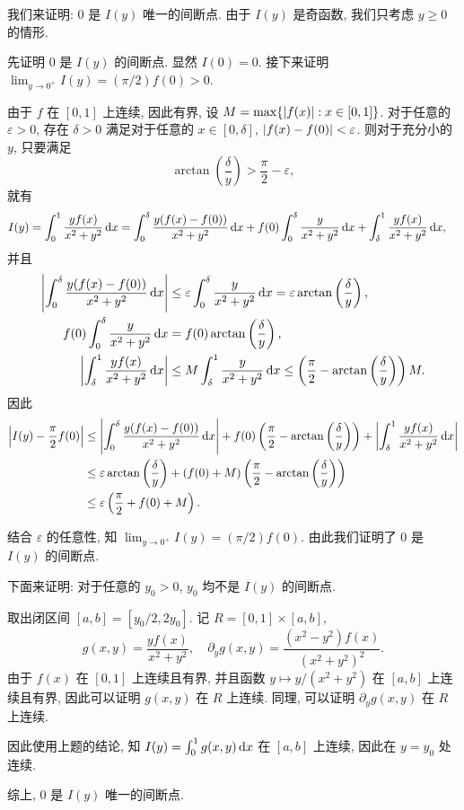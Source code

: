 \documentclass{article}
\begin{document}
\begin{solution}
	我们来证明: $0$ 是 $I(y)$ 唯一的间断点. 由于 $I(y)$ 是奇函数, 我们只考虑 $y\ge 0$ 的情形.

	先证明 $0$ 是 $I(y)$ 的间断点. 显然 $I(0) = 0$. 接下来证明 $\lim_{y\to 0^+} I(y) = (\pi/2)f(0)>0$. 

	由于 $f$ 在 $[0,1]$ 上连续, 因此有界, 设 $M=\max\{\left|f(x)\right|: x\in[0,1]\}$. 对于任意的 $\varepsilon>0$, 存在 $\delta>0$ 满足对于任意的 $x\in [0,\delta]$, $\left|f(x)-f(0)\right| <\varepsilon$. 则对于充分小的 $y$, 只要满足
	\[ \arctan\left( \frac{\delta}{y} \right) > \frac{\pi}{2}-\varepsilon, \]
	就有
	\begin{align*}
		I(y)
		&= \int_{0}^{1}\frac{yf(x)}{x^2+y^2}\,\mathrm{d} x
		= \int_{0}^{\delta}\frac{y(f(x)-f(0))}{x^2+y^2}\,\mathrm{d} x
		+ f(0) \int_{0}^{\delta} \frac{y}{x^2+y^2}\,\mathrm{d} x
		+ \int_{\delta}^{1}\frac{yf(x)}{x^2+y^2}\,\mathrm{d} x,
	\end{align*}
	并且
	\begin{align*}
		\left|\int_{0}^{\delta}\frac{y(f(x)-f(0))}{x^2+y^2}\,\mathrm{d} x\right|
		& \le \varepsilon \int_{0}^{\delta} \frac{y}{x^2+y^2}\,\mathrm{d} x
		=\varepsilon \arctan\left( \frac{\delta}{y} \right),\\
		f(0) \int_{0}^{\delta} \frac{y}{x^2+y^2}\,\mathrm{d} x 
		&= f(0) \arctan \left( \frac{\delta}{y} \right), \\
		\left|\int_{\delta}^{1}\frac{yf(x)}{x^2+y^2}\,\mathrm{d} x\right|
		&\le M \int_{\delta}^{1} \frac{y}{x^2+y^2}\,\mathrm{d} x
		\le \left( \frac{\pi}{2}-\arctan\left( \frac{\delta}{y} \right) \right)M.
	\end{align*}
	因此
	\begin{align*}
		\left|I(y) - \frac{\pi}{2}f(0)\right|
		&\le \left|\int_{0}^{\delta}\frac{y(f(x)-f(0))}{x^2+y^2}\,\mathrm{d} x\right|
		+ f(0) \left( \frac{\pi}{2} - \arctan\left( \frac{\delta}{y} \right)  \right)
		+ \left|\int_{\delta}^{1}\frac{yf(x)}{x^2+y^2}\,\mathrm{d} x\right| \\
		&\le \varepsilon \arctan\left( \frac{\delta}{y} \right)
		+ (f(0)+M) \left( \frac{\pi}{2}-\arctan\left( \frac{\delta}{y} \right) \right) \\
		&\le \varepsilon \left( \frac{\pi}{2} + f(0) + M \right).
	\end{align*}

结合 $\varepsilon$ 的任意性, 知 $\lim_{y\to 0^+}I(y) = (\pi/2)f(0)$. 由此我们证明了 $0$ 是 $I(y)$ 的间断点. 

下面来证明: 对于任意的 $y_0 > 0$, $y_0$ 均不是 $I(y)$ 的间断点.

取出闭区间 $[a,b] = [y_0/2,2y_0]$. 记 $R = [0,1] \times [a,b]$, 
\[ g(x,y) = \frac{yf(x)}{x^2+y^2}, \quad \partial_y g(x,y) = \frac{(x^2-y^2)f(x)}{(x^2+y^2)^2}. \]
由于 $f(x)$ 在 $[0,1]$ 上连续且有界, 并且函数 $y \mapsto y/(x^2+y^2)$ 在 $[a,b]$ 上连续且有界, 因此可以证明 $g(x,y)$ 在 $R$ 上连续. 同理, 可以证明 $\partial_y g(x,y)$ 在 $R$ 上连续. 

因此使用上题的结论, 知 $I(y) = \int_{0}^{1} g(x,y)\,\mathrm{d} x$ 在 $[a,b]$ 上连续, 因此在 $y=y_0$ 处连续.

综上, $0$ 是 $I(y)$ 唯一的间断点. 
\end{solution}
\end{document}
